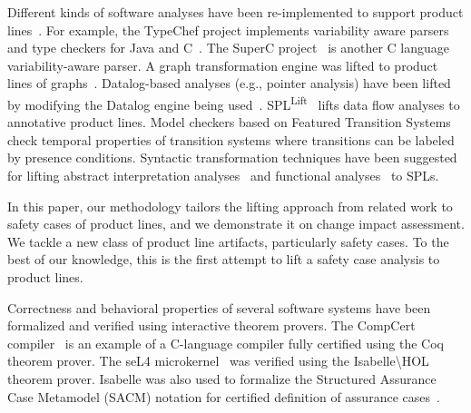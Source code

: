 \vskip 0.1in
 Different kinds of software analyses have been re-implemented to support product lines~\cite{Thum:2014}. 
For example, the TypeChef project implements variability aware parsers and type checkers for Java and C~\cite{Kastner:2012}. The SuperC project~\cite{Gazzillo:2012} is another C language variability-aware parser. A graph transformation engine was lifted to product lines of graphs~\cite{Salay:2014}. Datalog-based analyses (e.g., pointer analysis) have been lifted by modifying the Datalog engine being used~\cite{Shahin:2019}.
SPL\textsuperscript{Lift}~\cite{Bodden:2013} lifts data flow analyses to annotative product lines. Model checkers based on Featured Transition Systems~\cite{Classen:2013} check temporal properties of transition systems where transitions can be labeled by presence conditions. 
Syntactic transformation techniques have been suggested for lifting abstract interpretation analyses~\cite{Midtgaard:2015} and functional analyses~\cite{Shahin:2020} to SPLs.

In this paper, our methodology tailors the lifting approach from related work to safety cases of product lines, and we demonstrate it on change impact assessment. 
We tackle a new class of product line artifacts, particularly safety cases. To the best of our knowledge, this is the first attempt to lift a safety case analysis to product lines.
 
\vskip 0.1in
 Correctness and behavioral properties of several software systems have been formalized and verified using interactive theorem provers. The CompCert compiler~\cite{Leroy:2009} is an example of a C-language compiler fully certified using the Coq theorem prover. The seL4 microkernel~\cite{Klein:2009} was verified using the Isabelle\textbackslash HOL theorem prover. Isabelle was also used to formalize the Structured Assurance Case Metamodel (SACM) notation for certified definition of assurance cases~\cite{Nemouchi:2019}. 